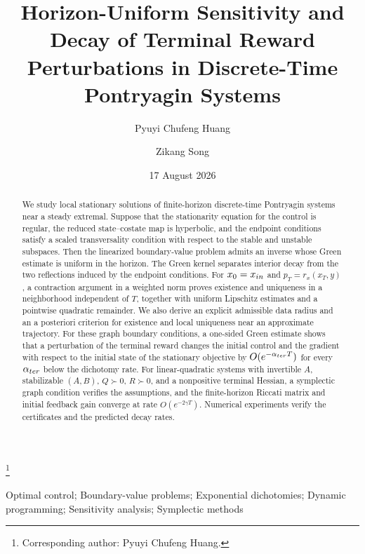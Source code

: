 \documentclass[twocolumn,nameyear,amsthm]{autart}
\numberwithin{equation}{section}
\begin{document}
\begin{frontmatter}
\date{17 August 2026}
\title{Horizon-Uniform Sensitivity and Decay of Terminal Reward Perturbations in Discrete-Time Pontryagin Systems}
\thanks[footnoteinfo]{Corresponding author: Pyuyi Chufeng Huang.}

\author[scu1]{Pyuyi Chufeng Huang}
\author[scu1]{Zikang Song}

\address[scu1]{School of Mathematics, Sichuan University, Chengdu, Sichuan, China}

\begin{keyword}
Optimal control; Boundary-value problems; Exponential dichotomies; Dynamic programming; Sensitivity analysis; Symplectic methods
\end{keyword}

\begin{abstract}
We study local stationary solutions of finite-horizon discrete-time
Pontryagin systems near a steady extremal.  Suppose that the stationarity
equation for the control is regular, the reduced state--costate map is
hyperbolic, and the endpoint conditions satisfy a scaled transversality
condition with respect to the stable and unstable subspaces.  Then the
linearized boundary-value problem admits an inverse whose Green estimate is
uniform in the horizon.  The Green kernel separates interior decay from the
two reflections induced by the endpoint conditions.  For $x_0=x_{\rm in}$ and
$p_T=r_x(x_T,y)$, a contraction argument in a weighted norm proves existence
and uniqueness in a neighborhood independent of $T$, together with uniform
Lipschitz estimates and a pointwise quadratic remainder.  We also derive an
explicit admissible data radius and an a posteriori criterion for existence
and local uniqueness near an approximate trajectory.  For these graph
boundary conditions, a one-sided Green estimate shows that a perturbation of
the terminal reward changes the initial control and the gradient with respect to the initial state
of the stationary objective by $O(e^{-\alpha_{\rm ter} T})$ for every
$\alpha_{\rm ter}$ below the dichotomy rate.  For linear-quadratic systems with
invertible $A$, stabilizable $(A,B)$, $Q\succ0$, $R\succ0$, and a nonpositive terminal
Hessian, a symplectic graph condition verifies the assumptions, and the
finite-horizon Riccati matrix and initial feedback gain converge at rate
$O(e^{-2\gamma T})$.  Numerical experiments verify the certificates and the
predicted decay rates.
\end{abstract}
\end{frontmatter}
\end{document}
